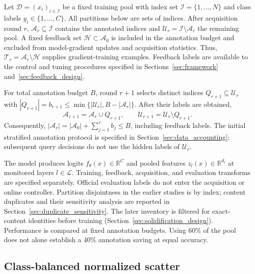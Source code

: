 \documentclass[10pt,a4paper,twocolumn]{article}
\newcommand{\R}{\mathbb{R}}
\begin{document}
Let $\mathcal D=(x_i)_{i\in\mathcal I}$ be a fixed training pool with
index set $\mathcal I=\{1,\ldots,N\}$ and class labels
$y_i\in\{1,\ldots,C\}$. All partitions below are sets of indices.
After acquisition round $r$, $\mathcal A_r\subseteq\mathcal I$ contains
the annotated indices and $\mathcal U_r=\mathcal I\setminus\mathcal A_r$
the remaining pool. A fixed feedback set $\mathcal H\subset\mathcal A_0$
is included in the annotation budget and excluded from model-gradient
updates and acquisition statistics. Thus,
$\mathcal T_r=\mathcal A_r\setminus\mathcal H$ supplies gradient-training
examples. Feedback labels are available to the control and tuning
procedures specified in Sections~\ref{sec:framework}
and~\ref{sec:feedback_design}.

For total annotation budget $B$, round $r+1$ selects distinct indices
$Q_{r+1}\subseteq\mathcal U_r$ with
$|Q_{r+1}|=b_{r+1}\le\min\{|\mathcal U_r|,B-|\mathcal A_r|\}$.
After their labels are obtained,
\[
 \mathcal A_{r+1}=\mathcal A_r\cup Q_{r+1},\qquad
 \mathcal U_{r+1}=\mathcal U_r\setminus Q_{r+1}.
\]
Consequently, $|\mathcal A_r|=|\mathcal A_0|+\sum_{j=1}^r b_j\le B$,
including feedback labels. The initial stratified annotation protocol is
specified in Section~\ref{sec:data_accounting}; subsequent query decisions
do not use the hidden labels of $\mathcal U_r$.

The model produces logits $f_\theta(x)\in\R^C$ and pooled features
$z_l(x)\in\R^{d_l}$ at monitored layers $l\in\mathcal L$.
Training, feedback, acquisition, and evaluation transforms are specified
separately. Official evaluation labels do not enter the acquisition or
online controller. Partition disjointness in the earlier studies is by
index; content duplicates and their sensitivity analysis are reported in
Section~\ref{sec:duplicate_sensitivity}. The later inventory is filtered
for exact-content identities before training
(Section~\ref{sec:solidification_design}).
Performance is compared at fixed annotation budgets. Using 60\% of the
pool does not alone establish a 40\% annotation saving at equal accuracy.

\subsection{Class-balanced normalized scatter}
\end{document}
